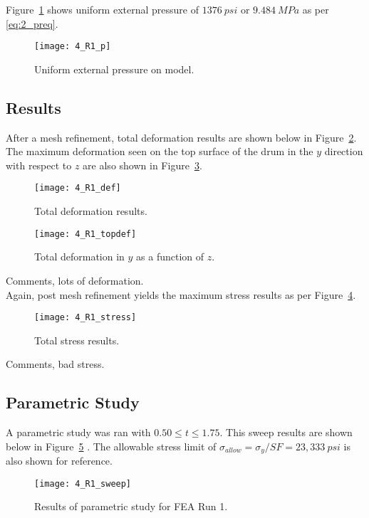 Figure~\ref{fig:4_R1_p} shows uniform external pressure of $1376\ psi$ or $9.484\  MPa$ as per \ref{eq:2_preq}.
\begin{figure}[H]
	\centering
	\texttt{[image: 4\_R1\_p]}
	\caption{Uniform external pressure on model.}
	\label{fig:4_R1_p}
\end{figure}

\subsection{Results}

After a mesh refinement, total deformation results are shown below in Figure~\ref{fig:4_R1_def}. The maximum deformation seen on the top surface of the drum in the $y$ direction with respect to $z$ are also shown in Figure~\ref{fig:4_R1_topdef}.

\begin{figure}[H]
	\centering
	\texttt{[image: 4\_R1\_def]}
	\caption{Total deformation results.}
	\label{fig:4_R1_def}
\end{figure}
\begin{figure}[H]
	\centering
	\texttt{[image: 4\_R1\_topdef]}
	\caption{Total deformation in $y$ as a function of $z$.}
	\label{fig:4_R1_topdef}
\end{figure}

Comments, lots of deformation.\\

Again, post mesh refinement yields the maximum stress results as per Figure~\ref{fig:4_R1_stress}.

\begin{figure}[H]
	\centering
	\texttt{[image: 4\_R1\_stress]}
	\caption{Total stress results.}
	\label{fig:4_R1_stress}
\end{figure}

Comments, bad stress.


\subsection{Parametric Study}

A parametric study was ran with $0.50 \leq t \leq 1.75$. This sweep results are shown below in Figure~\ref{fig:4_R1_sweep} \cite{EXCEL}. The allowable stress limit of $\sigma_{allow}=\sigma_{y}/SF = 23,333\ psi$ is also shown for reference.

\begin{figure}[H]
	\centering
	\texttt{[image: 4\_R1\_sweep]}
	\caption{Results of parametric study for FEA Run 1.}
	\label{fig:4_R1_sweep}
\end{figure}

